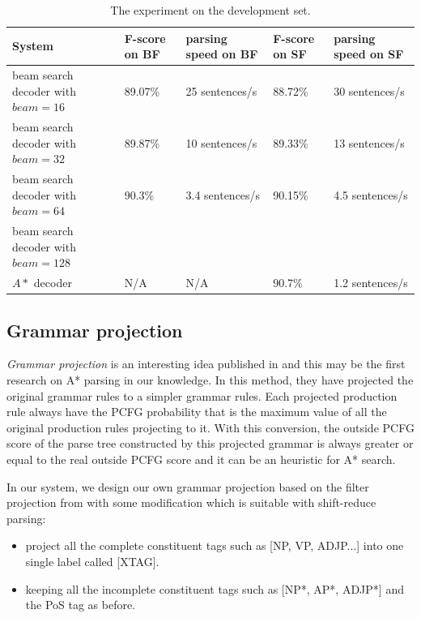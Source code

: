 \begin{table}
	\begin{center}
		\caption{\label{first experiment} The experiment on the development set.}
		\begin{tabular}{|p{2cm}|p{3cm}|p{3cm}|p{3cm}|p{3cm}|}
			\hline 
			System & F-score on BF & parsing speed on BF & F-score on SF & parsing speed on SF \\ \hline
			beam search decoder with $beam = 16$ & 89.07\% & 25 sentences/s & 88.72\% & 30 sentences/s \\ \hline
			beam search decoder with $beam = 32$ & 89.87\% & 10 sentences/s & 89.33\% & 13 sentences/s \\ \hline	
			beam search decoder with $beam = 64$ & 90.3\% & 3.4 sentences/s & 90.15\% & 4.5 sentences/s \\ \hline
			beam search decoder with $beam = 128$ & & & & \\ \hline
			$A*$ decoder & N/A & N/A & 90.7\% & 1.2 sentences/s \\
			\hline
		\end{tabular}
	\end{center}
\end{table}


\subsection{Grammar projection}
\textit{Grammar projection} is an interesting idea published in \cite{ref:2003Dan1} and this may be the first research on A* parsing in our knowledge. In this method, they have projected the original grammar rules to a simpler grammar rules. Each projected production rule always have the PCFG probability that is the maximum value of all the original production rules projecting to it. With this conversion, the outside PCFG score of the parse tree constructed by this projected grammar is always greater or equal to the real outside PCFG score and it can be an heuristic for A* search.

In our system, we design our own grammar projection based on the filter projection from \cite{ref:2003Dan1} with some modification which is suitable with shift-reduce parsing:
\begin{itemize}
	\item project all the complete constituent tags such as [NP, VP, ADJP...] into one single label called [XTAG].
	\item keeping all the incomplete constituent tags such as [NP*, AP*, ADJP*] and the PoS tag as before.
\end{itemize}

